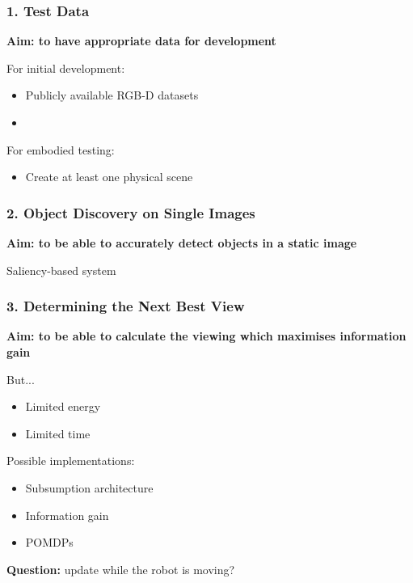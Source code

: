 
\begin{frame}[c] \frametitle{1. Test Data}

	\textbf{Aim: to have appropriate data for development}

	\vfill

	For initial development:

	\begin{itemize}\itemsep10pt
		\item Publicly available RGB-D datasets
		\item \cite{firman2016}
	\end{itemize}

	\vfill

	For embodied testing:

	\begin{itemize}\itemsep10pt
		\item Create at least one physical scene
	\end{itemize}


	\vfill

\end{frame}


\begin{frame}[c] \frametitle{2. Object Discovery on Single Images}

	\textbf{Aim: to be able to accurately detect objects in a static image}

	Saliency-based system \cite{garcia2013computational}

\end{frame}


\begin{frame}[c] \frametitle{3. Determining the Next Best View}

	\textbf{Aim: to be able to calculate the viewing which maximises information gain}

	But...

	\begin{itemize}
		\item Limited energy
		\item Limited time
	\end{itemize}

	Possible implementations:

	\begin{itemize}
		\item Subsumption architecture \cite{brooks1986robust}
		\item Information gain \cite{surmann2003autonomous}
		\item POMDPs \cite{lauri2015planning}
	\end{itemize}

	\vfill

	\textbf{Question:} update while the robot is moving?

\end{frame}


